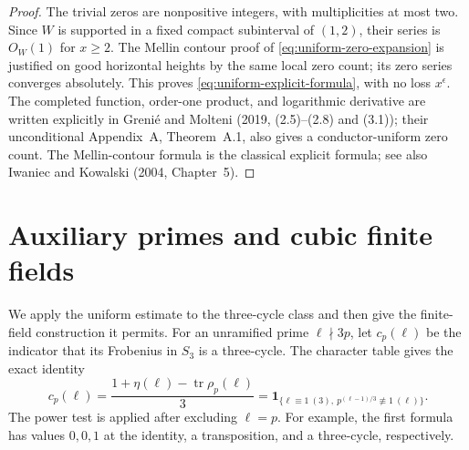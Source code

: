 \documentclass[11pt]{article}
\begin{document}
\begin{proof}
The trivial zeros are nonpositive integers, with multiplicities at
most two. Since $W$ is supported in a fixed compact subinterval of
$(1,2)$, their series is $O_W(1)$ for $x\ge2$.
The Mellin contour proof of \eqref{eq:uniform-zero-expansion} is justified on good horizontal
heights by the same local zero count; its zero series converges
absolutely. This proves \eqref{eq:uniform-explicit-formula}, with no loss $x^\epsilon$.
The completed function, order-one product, and logarithmic derivative
are written explicitly in Greni\'e and Molteni (2019, (2.5)--(2.8)
and (3.1)); their unconditional Appendix~A, Theorem~A.1, also gives
a conductor-uniform zero count. The Mellin-contour formula is the
classical explicit formula; see also Iwaniec and Kowalski
(2004, Chapter~5).
\end{proof}

\section{Auxiliary primes and cubic finite fields}
We apply the uniform estimate to the three-cycle class and then give
the finite-field construction it permits.
For an unramified prime $\ell\nmid3p$, let $c_p(\ell)$ be the
indicator that its Frobenius in $S_3$ is a three-cycle. The
character table gives the exact identity
\[
 c_p(\ell)=\frac{1+\eta(\ell)-\operatorname{tr}\rho_p(\ell)}3
 =\mathbf1_{\{\ell\equiv1\ (3),\ p^{(\ell-1)/3}\not\equiv1\ (\ell)\}}.
                                                                    \tag{2.1}
\]
The power test is applied after excluding $\ell=p$. For example, the first
formula has values $0,0,1$ at the identity, a transposition, and
a three-cycle, respectively.
\end{document}
